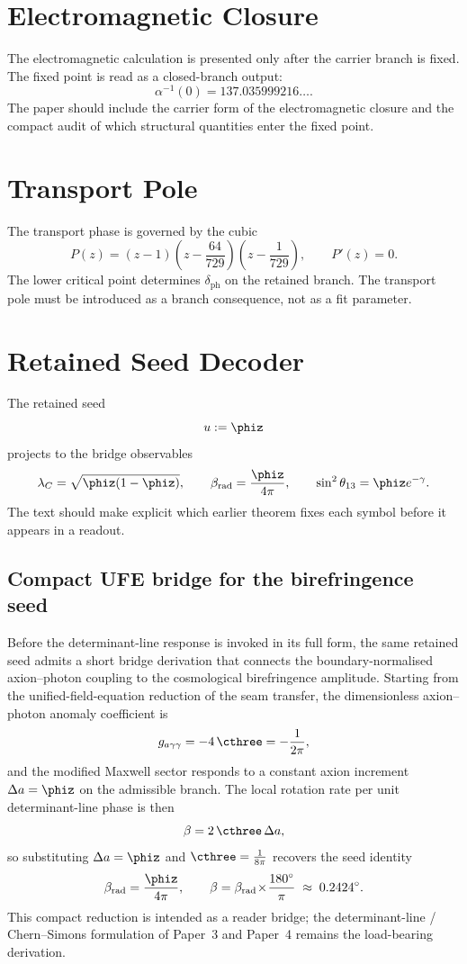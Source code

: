 \tableofcontents

\section{Electromagnetic Closure}

The electromagnetic calculation is presented only after the carrier branch is fixed. The fixed
point is read as a closed-branch output:
\[
\alpha^{-1}(0)=137.035999216\ldots.
\]
The paper should include the carrier form of the electromagnetic closure and the compact audit of
which structural quantities enter the fixed point.

\section{Transport Pole}

The transport phase is governed by the cubic
\[
P(z)=(z-1)\left(z-\frac{64}{729}\right)\left(z-\frac{1}{729}\right),
\qquad
P'(z)=0.
\]
The lower critical point determines $\delta_{\mathrm{ph}}$ on the retained branch. The transport
pole must be introduced as a branch consequence, not as a fit parameter.

\section{Retained Seed Decoder}

The retained seed
\[
u:=\phiz
\]
projects to the bridge observables
\[
\lambda_C=\sqrt{\phiz(1-\phiz)},
\qquad
\beta_{\mathrm{rad}}=\frac{\phiz}{4\pi},
\qquad
\sin^2\theta_{13}=\phiz e^{-\gamma}.
\]
The text should make explicit which earlier theorem fixes each symbol before it appears in a
readout.

\subsection{Compact UFE bridge for the birefringence seed}
\label{ssec:ufe-birefringence-bridge}

Before the determinant-line response is invoked in its full form, the same retained seed admits a
short bridge derivation that connects the boundary-normalised axion--photon coupling to the
cosmological birefringence amplitude. Starting from the unified-field-equation reduction of the
seam transfer, the dimensionless axion--photon anomaly coefficient is
\[
g_{a\gamma\gamma}=-4\,\cthree=-\frac{1}{2\pi},
\]
and the modified Maxwell sector responds to a constant axion increment $\Delta a=\phiz$ on the
admissible branch. The local rotation rate per unit determinant-line phase is then
\[
\beta = 2\,\cthree\,\Delta a,
\]
so substituting $\Delta a=\phiz$ and $\cthree=\tfrac{1}{8\pi}$ recovers the seed identity
\begin{equation}
\label{eq:beta-rad-ufe-bridge}
\beta_{\mathrm{rad}}=\frac{\phiz}{4\pi},
\qquad
\beta=\beta_{\mathrm{rad}}\!\times\!\frac{180^\circ}{\pi}\;\approx\;0.2424^\circ.
\end{equation}
This compact reduction is intended as a reader bridge; the determinant-line / Chern--Simons
formulation of Paper~3 and Paper~4 remains the load-bearing derivation.

